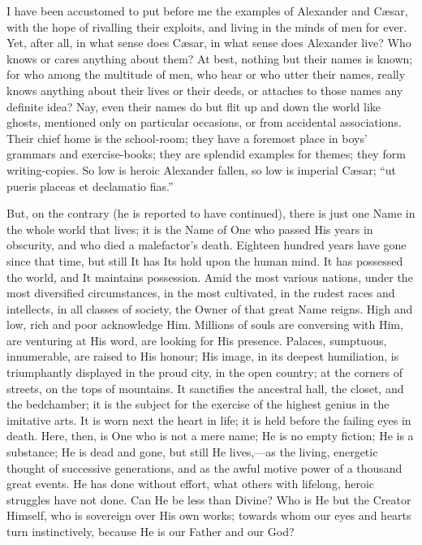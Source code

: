 I have been accustomed to put before me the examples
of Alexander and Cæsar, with the hope of rivalling their
exploits, and living in the minds of men for ever. Yet,
after all, in what sense does Cæsar, in what sense does
Alexander live? Who knows or cares anything about them?
At best, nothing but their names is known; for who among
the multitude of men, who hear or who utter their names,
really knows anything about their lives or their deeds,
or attaches to those names any definite idea? Nay, even
their names do but flit up and down the world like
ghosts, mentioned only on particular occasions, or from
accidental associations. Their chief home is the
school-room; they have a foremost place in boys' grammars
and exercise-books; they are splendid examples for
themes; they form writing-copies. So low is heroic
Alexander fallen, so low is imperial Cæsar; ``ut
pueris placeas et declamatio fias.''

But, on the contrary (he is reported to have
continued), there is just one Name in the whole world
that lives; it is the Name of One who passed His years in
obscurity, and who died a malefactor's death. Eighteen
hundred years have gone since that time, but still It has
Its hold upon the human mind. It has possessed the world,
and It maintains possession. Amid the most various
nations, under the most diversified circumstances, in the
most cultivated, in the rudest races and intellects, in
all classes of society, the Owner of that great Name
reigns. High and low, rich and poor acknowledge Him.
Millions of souls are conversing with Him, are venturing
at His word, are looking for His presence. Palaces,
sumptuous, innumerable, are raised to His honour; His
image, in its deepest humiliation, is triumphantly
displayed in the proud city, in the open country; at the
corners of streets, on the tops of mountains. It
sanctifies the ancestral hall, the closet, and the
bedchamber; it is the subject for the exercise of the
highest genius in the imitative arts. It is worn next the
heart in life; it is held before the failing eyes in
death. Here, then, is One who is not a mere name; He is
no empty fiction; He is a substance; He is dead and gone,
but still He lives,—as the living, energetic thought
of successive generations, and as the awful motive power
of a thousand great events. He has done without effort,
what others with lifelong, heroic struggles have not
done. Can He be less than Divine? Who is He but the
Creator Himself, who is sovereign over His own works;
towards whom our eyes and hearts turn instinctively,
because He is our Father and our God?

